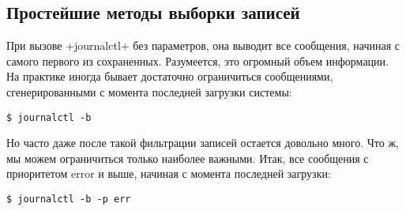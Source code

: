 \documentclass[10pt,oneside,a4paper]{article}
\begin{document}
\subsection{Простейшие методы выборки записей}

При вызове +journalctl+ без параметров, она выводит все сообщения, начиная с
самого первого из сохраненных. Разумеется, это огромный объем информации. На
практике иногда бывает достаточно ограничиться сообщениями, сгенерированными с
момента последней загрузки системы:
\begin{Verbatim}
$ journalctl -b
\end{Verbatim}
Но часто даже после такой фильтрации записей остается довольно много. Что ж, мы
можем ограничиться только наиболее важными. Итак, все сообщения с приоритетом
error и выше, начиная с момента последней загрузки:
\begin{Verbatim}
$ journalctl -b -p err
\end{Verbatim}
\end{document}
